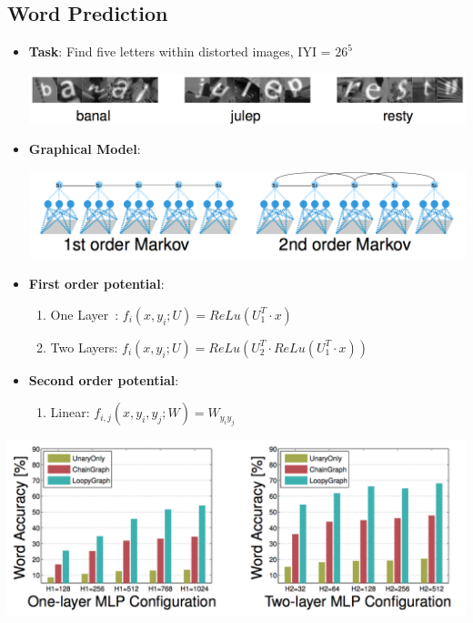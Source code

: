 \documentclass{beamer}
\begin{document}
\subsection*{Word Prediction}
\begin{frame}
	\begin{itemize}
		\item \textbf{Task}: Find five letters within distorted images, IYI = $26^5$
			\begin{center}
				\includegraphics[scale=0.25]{img/words1}
			\end{center}
			
		\item \textbf{Graphical Model}:
			\begin{center}
				\includegraphics[scale=0.3]{img/words2}
			\end{center}
				
		\item \textbf{First order potential}: 
		\begin{enumerate}
			\item One Layer~: $f_i(x, y_i; U) = ReLu(U_1^T \cdot x)$
			\item Two Layers: $f_i(x, y_i; U) = ReLu(U_2^T \cdot ReLu(U_1^T \cdot x))$
		\end{enumerate}
		\item \textbf{Second order potential}: 
		\begin{enumerate}
			\item Linear: $f_{i, j}(x, y_i, y_j; W) = W_{y_iy_j}$
		\end{enumerate}
	\end{itemize}
\end{frame}

\begin{frame}
	\begin{center}		
		\includegraphics[scale=0.28]{img/words3}
	\end{center}		
\end{frame}
\end{document}
